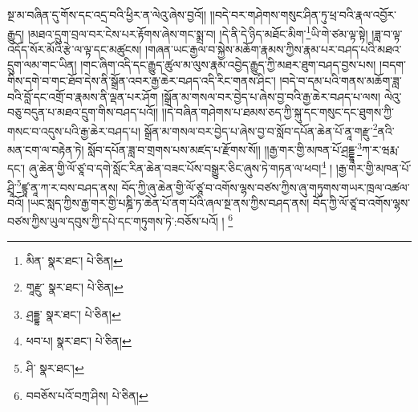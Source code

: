 སྔ་མ་བཞིན་དུ་གོས་དང་འདྲ་བའི་ཕྱིར་ན་ལེའུ་ཞེས་བྱའོ།། །།བདེ་བར་གཤེགས་གསུང་ཤིན་ཏུ་ཕྲ་བའི་རྣལ་འབྱོར་རྒྱུད། །མཐའ་དྲུག་བྲལ་བར་ངེས་པར་རྟོགས་ཞེས་གང་སྨྲ་བ། །དེ་ནི་དེ་ཉིད་མཐོང་མིག་\footnote{མིན་  སྣར་ཐང་།  པེ་ཅིན། }ཡི་གེ་ཙམ་ལྟ་སྟེ། །ཟླ་བ་ལྟ་འདོད་སོར་མོའི་རྩེ་ལ་ལྟ་དང་མཚུངས། །གཞན་ཡང་རྒྱལ་བ་སྐྱེས་མཆོག་རྣམས་ཀྱིས་རྣམ་པར་བཤད་པའི་མཐའ་དྲུག་ལམ་གང་ཡིན། །གང་ཞིག་འདི་དང་རྒྱུད་ཚུལ་མ་ལུས་རྣམ་འབྱེད་རྒྱུད་ཀྱི་མཐར་ཐུག་བཤད་བྱས་པས། །བདག་གིས་དགེ་བ་གང་ཐོབ་དེས་ནི་སྒྲོན་འབར་རྒྱ་ཆེར་བཤད་འདི་རིང་གནས་ཤིང་། །བདེ་བ་དམ་པའི་གནས་མཆོག་ཟླ་བའི་བློ་དང་འགྲོ་བ་རྣམས་ནི་ལྡན་པར་ཤོག །སྒྲོན་མ་གསལ་བར་བྱེད་པ་ཞེས་བྱ་བའི་རྒྱ་ཆེར་བཤད་པ་ལས། ལེའུ་བཅུ་བདུན་པ་མཐའ་དྲུག་གིས་བཤད་པའོ།། །།དེ་བཞིན་གཤེགས་པ་ཐམས་ཅད་ཀྱི་སྐུ་དང་གསུང་དང་ཐུགས་ཀྱི་གསང་བ་འདུས་པའི་རྒྱ་ཆེར་བཤད་པ། སྒྲོན་མ་གསལ་བར་བྱེད་པ་ཞེས་བྱ་བ་སློབ་དཔོན་ཆེན་པོ་ནཱ་གརྫུ་\footnote{གཱརྫུ་  སྣར་ཐང་།  པེ་ཅིན། }ནའི་མན་ངག་ལ་བརྟེན་ཏེ། སློབ་དཔོན་ཟླ་བ་གྲགས་པས་མཛད་པ་རྫོགས་སོ།། །།རྒྱ་གར་གྱི་མཁན་པོ་ཤྲདྡྷཱ་\footnote{ཤྲདྡྷ་  སྣར་ཐང་།  པེ་ཅིན། }ཀ་ར་ཝརྨ་དང་། ཞུ་ཆེན་གྱི་ལོ་ཙཱ་བ་དགེ་སློང་རིན་ཆེན་བཟང་པོས་བསྒྱུར་ཅིང་ཞུས་ཏེ་གཏན་ལ་ཕབ།\footnote{ཕབ་པ།  སྣར་ཐང་།  པེ་ཅིན། } ། །རྒྱ་གར་གྱི་མཁན་པོ་ཤྲཱི་\footnote{ཤི་  སྣར་ཐང་། }ཛྙཱ་ནཱ་ཀ་ར་བས་བཤད་ནས། བོད་ཀྱི་ཞུ་ཆེན་གྱི་ལོ་ཙཱ་བ་འགོས་ལྷས་བཙས་ཀྱིས་ཞུ་གཏུགས་གཡར་ཁྲལ་འཚལ་བའོ། །ཡང་སླད་ཀྱིས་རྒྱ་གར་གྱི་པཎྜི་ཏ་ཆེན་པོ་ནག་པོའི་ཞལ་སྔ་ནས་ཀྱིས་བཤད་ནས། བོད་ཀྱི་ལོ་ཙཱ་བ་འགོས་ལྷས་བཙས་ཀྱིས་ཡུལ་དབུས་ཀྱི་དཔེ་དང་གཏུགས་ཏེ་:བཅོས་པའོ། ། \footnote{བབཅོས་པའོ་བཀྲ་ཤིས།   པེ་ཅིན། }